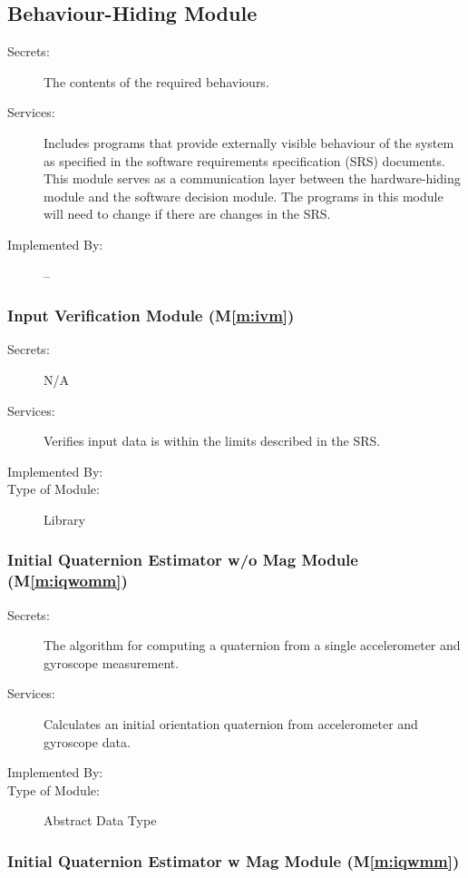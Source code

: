 \documentclass[12pt, titlepage]{article}
\newcommand{\mref}[1]{M\ref{#1}}
\begin{document}
\subsection{Behaviour-Hiding Module}

\begin{description}
\item[Secrets:]The contents of the required behaviours.
\item[Services:]Includes programs that provide externally visible behaviour of the system as
  specified in the software requirements specification (SRS) documents. This module serves as a
  communication layer between the hardware-hiding module and the software decision module. The
  programs in this module will need to change if there are changes in the SRS.
\item[Implemented By:] --
\end{description}

\subsubsection{Input Verification Module (\mref{m:ivm})}

\begin{description}
\item[Secrets:] N/A
\item[Services:] Verifies input data is within the limits described in the SRS.
\item[Implemented By:] \progname
\item[Type of Module:] Library
\end{description}

\subsubsection{Initial Quaternion Estimator w/o Mag Module (\mref{m:iqwomm})}

\begin{description}
\item[Secrets:] The algorithm for computing a quaternion from a single accelerometer and gyroscope measurement.
\item[Services:] Calculates an initial orientation quaternion from accelerometer and gyroscope data.
\item[Implemented By:] \progname
\item[Type of Module:] Abstract Data Type
\end{description}

\subsubsection{Initial Quaternion Estimator w Mag Module (\mref{m:iqwmm})}
\end{document}
